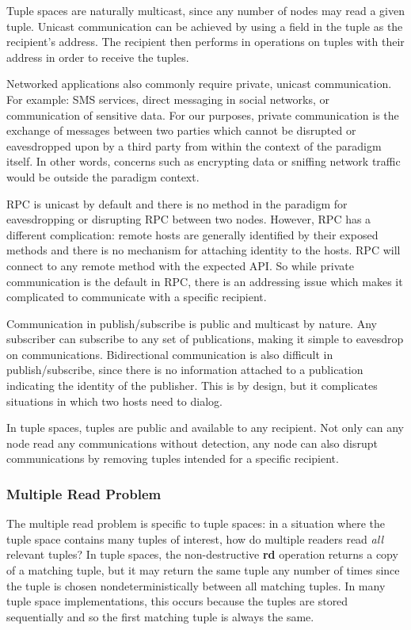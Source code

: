 Tuple spaces are naturally multicast, since any number of nodes may read a given tuple. Unicast communication can be achieved by using a field in the tuple as the recipient's address. The recipient then performs in operations on tuples with their address in order to receive the tuples.

Networked applications also commonly require private, unicast communication. For example: SMS services, direct messaging in social networks, or communication of sensitive data. For our purposes, private communication is the exchange of messages between two parties which cannot be disrupted or eavesdropped upon by a third party from within the context of the paradigm itself. In other words, concerns such as encrypting data or sniffing network traffic would be outside the paradigm context.

RPC is unicast by default and there is no method in the paradigm for eavesdropping or disrupting RPC between two nodes. However, RPC has a different complication: remote hosts are generally identified by their exposed methods and there is no mechanism for attaching identity to the hosts. RPC will connect to any remote method with the expected API. So while private communication is the default in RPC, there is an addressing issue which makes it complicated to communicate with a specific recipient.

Communication in publish/subscribe is public and multicast by nature. Any subscriber can subscribe to any set of publications, making it simple to eavesdrop on communications. Bidirectional communication is also difficult in publish/subscribe, since there is no information attached to a publication indicating the identity of the publisher. This is by design, but it complicates situations in which two hosts need to dialog.

In tuple spaces, tuples are public and available to any recipient. Not only can any node read any communications without detection, any node can also disrupt communications by removing tuples intended for a specific recipient.

\subsubsection{Multiple Read Problem}\label{sec:multipleread}

The multiple read problem \cite{mrdp} is specific to tuple spaces: in a situation where the tuple space contains many tuples of interest, how do multiple readers read \textit{all} relevant tuples? In tuple spaces, the non-destructive \textbf{rd} operation returns a copy of a matching tuple, but it may return the same tuple any number of times since the tuple is chosen nondeterministically between all matching tuples. In many tuple space implementations, this occurs because the tuples are stored sequentially and so the first matching tuple is always the same\cite{de2012new}.

